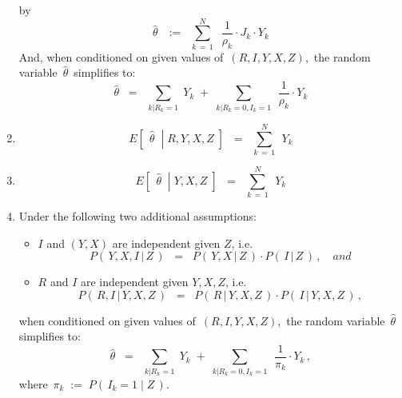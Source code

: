 \begin{proposition}
\begin{enumerate}
	by
	\begin{equation*}
	\widehat{\theta}
	\,\;\; := \;\;
		\overset{N}{\underset{k\,=\,1}{\sum}}\;\;
		\dfrac{1}{\rho_{k}} \cdot J_{k} \cdot Y_{k}
	\end{equation*}
	And, when conditioned on given values of \,$(R,I,Y,X,Z)$,\,
	the random variable \,$\widehat{\theta}$\, simplifies to:
	\begin{equation*}
	\widehat{\theta}
	\;\; = \;\;
		\underset{k\vert R_{k}=1}{\sum}\; Y_{k}
		\; + \;
		\underset{k\vert R_{k}=0,I_{k}=1}{\sum}\;\, \dfrac{1}{\rho_{k}}\cdot Y_{k}
	\end{equation*}
\item
	\begin{equation*}
	E\!\left[\;\,\left.\widehat{\theta}\;\;\right\vert\;R,Y,X,Z\;\right]
	\;\; = \;\;
		\overset{N}{\underset{k\,=\,1}{\sum}}\;\, Y_{k}	
	\end{equation*}
\item
	\begin{equation*}
	E\!\left[\;\,\left.\widehat{\theta}\;\;\right\vert\;Y,X,Z\;\right]
	\;\; = \;\;
		\overset{N}{\underset{k\,=\,1}{\sum}}\;\, Y_{k}	
	\end{equation*}
\item
	Under the following two additional assumptions:
	\begin{itemize}
	\item
		$I$ and $(Y,X)$ are independent given $Z$, i.e.
		\begin{equation*}
		P\!\left(\,Y,X,I\,\vert\,Z\,\right)
		\;\; = \;\;
			P\!\left(\,Y,X\,\vert\,Z\,\right)
			\cdot
			P\!\left(\,I\,\vert\,Z\,\right)\,,
			\quad
			\textit{and}
		\end{equation*}
	\item
		$R$ and $I$ are independent given $Y,X,Z$, i.e.
		\begin{equation*}
		P\!\left(\,R,I\,\vert\,Y,X,Z\,\right)
		\;\; = \;\;
			P\!\left(\,R\,\vert\,Y,X,Z\,\right)
			\cdot
			P\!\left(\,I\,\vert\,Y,X,Z\,\right)\,,
		\end{equation*}	
	\end{itemize}
	when conditioned on given values of \,$(R,I,Y,X,Z)$,\, the random variable \,$\widehat{\theta}$\, simplifies to:
	\begin{equation*}
	\widehat{\theta}
	\;\; = \;\;
		\underset{k\vert R_{k}=1}{\sum}\; Y_{k}
		\; + \;
		\underset{k\vert R_{k}=0,I_{k}=1}{\sum}\;\, \dfrac{1}{\pi_{k}}\cdot Y_{k}\,,
	\end{equation*}
	where \,$\pi_{k} \; := \; P(\,I_{k}=1\;\vert\;Z\,)$.

\end{enumerate}
\end{proposition}
